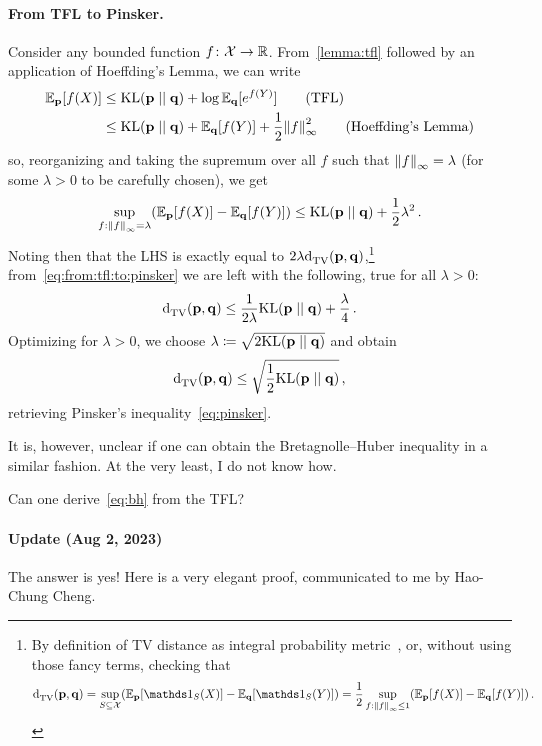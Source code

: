 \documentclass[10pt]{article}
\renewcommand{\eqdef}{\coloneqq}
\begin{document}
\paragraph{From TFL to Pinsker.} Consider any bounded function $f\colon\mathcal{X}\to\mathbb{R}$. From~\autoref{lemma:tfl} followed by an application of Hoeffding's Lemma, we can write
\begin{align*}
  \shortexpect_{\p}[f(X)] 
    &\leq \kldiv{\p}{\q} + \log \shortexpect_{\q}[e^{f(Y)}]  \tag{TFL}\\
    &\leq \kldiv{\p}{\q} + \shortexpect_{\q}[f(Y)] + \frac{1}{2}\norminf{f}^2 \tag{Hoeffding's Lemma}
\end{align*}
so, reorganizing and taking the supremum over all $f$ such that ${\lVert f{\rVert}}_\infty=\lambda$ (for some $\lambda>0$ to be carefully chosen), we get
\begin{equation}
  \label{eq:from:tfl:to:pinsker}
    \sup_{f: \norminf{f}=\lambda} \mleft( \shortexpect_{\p}[f(X)] - \shortexpect_{\q}[f(Y)] \mright) \leq \kldiv{\p}{\q} + \frac{1}{2}\lambda^2\,.
\end{equation}
Noting then that the LHS is exactly equal to $2\lambda\totalvardist{\p}{\q}$,\footnote{By definition of TV distance as integral probability metric~\cite{Muller97}, or, without using those fancy terms, checking that 
\[
  \totalvardist{\p}{\q} = \sup_{S\subseteq \domain} (\shortexpect_{\p}[\indicSet{S}(X)]-\shortexpect_{\q}[\indicSet{S}(Y)]) = \frac{1}{2}\sup_{f:\norminf{f}\leq 1} (\shortexpect_{\p}[f(X)]-\shortexpect_{\q}[f(Y)])\,.
\]}
from~\eqref{eq:from:tfl:to:pinsker} we are left with the following, true for all $\lambda>0$:
\begin{equation}
  \totalvardist{\p}{\q} \leq \frac{1}{2\lambda}\kldiv{\p}{\q} + \frac{\lambda}{4}\,.
\end{equation}
Optimizing for $\lambda>0$, we choose $\lambda \eqdef \sqrt{2\kldiv{\p}{\q}}$ and obtain
\begin{equation}
  \totalvardist{\p}{\q} \leq \sqrt{\frac{1}{2}\kldiv{\p}{\q}}\,,
\end{equation}
retrieving Pinsker's inequality~\eqref{eq:pinsker}.\smallskip

It is, however, unclear if one can obtain the Bretagnolle--Huber inequality in a similar fashion. At the very least, I do not know how.
\begin{question}
  Can one derive~\eqref{eq:bh} from the TFL?
\end{question}

\paragraph{Update (Aug 2, 2023)} The answer is yes! Here is a very elegant proof, communicated to me by Hao-Chung Cheng.\medskip
\end{document}
